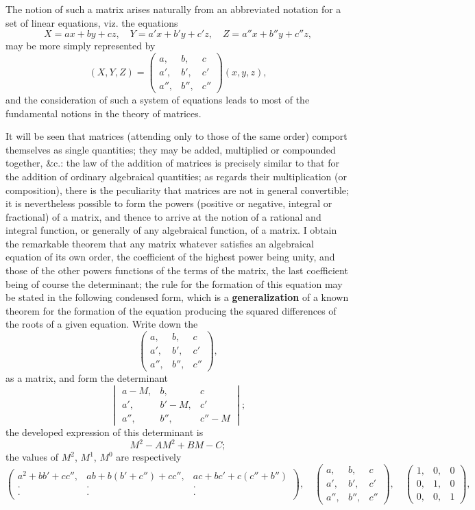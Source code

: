 \documentclass[12pt,a4paper]{article}
\theoremstyle{definition}
\begin{document}
The notion of such a matrix arises naturally from an abbreviated notation for a set of linear equations, viz. the equations
\[
X = ax + by + cz,\quad Y = a'x + b'y + c'z,\quad Z = a''x + b''y + c''z,
\]
may be more simply represented by
\[
(X, Y, Z) = \begin{pmatrix} a, & b, & c \\ a', & b', & c' \\ a'', & b'', & c'' \end{pmatrix}(x, y, z),
\]
and the consideration of such a system of equations leads to most of the fundamental notions in the theory of matrices.

It will be seen that matrices (attending only to those of the same order) comport themselves as single quantities; they may be added, multiplied or compounded together, \&c.: the law of the addition of matrices is precisely similar to that for the addition of ordinary algebraical quantities; as regards their multiplication (or composition), there is the peculiarity that matrices are not in general convertible; it is nevertheless possible to form the powers (positive or negative, integral or fractional) of a matrix, and thence to arrive at the notion of a rational and integral function, or generally of any algebraical function, of a matrix. I obtain the remarkable theorem that any matrix whatever satisfies an algebraical equation of its own order, the coefficient of the highest power being unity, and those of the other powers functions of the terms of the matrix, the last coefficient being of course the determinant; the rule for the formation of this equation may be stated in the following condensed form, which is a {\bfseries generalization} of a known theorem for the formation of the equation producing the squared differences of the roots of a given equation. Write down the 
\[
\begin{pmatrix}
a, & b, & c \\
a', & b', & c' \\
a'', & b'', & c''
\end{pmatrix},
\]
as a matrix, and form the determinant
\[
\begin{vmatrix}
a-M, & b, & c \\
a', & b'-M, & c' \\
a'', & b'', & c''-M
\end{vmatrix};
\]
the developed expression of this determinant is
\[M^2 - AM^2 + BM - C;\]
the values of $M^2$, $M^1$, $M^0$ are respectively
\[
\begin{pmatrix}
a^2+bb'+cc'', & ab+b(b'+c'')+cc'', & ac+bc'+c(c''+b'') \\
\cdot & \cdot & \cdot \\
\cdot & \cdot & \cdot
\end{pmatrix},
\quad
\begin{pmatrix} a, & b, & c \\ a', & b', & c' \\ a'', & b'', & c'' \end{pmatrix},
\quad
\begin{pmatrix} 1, & 0, & 0 \\ 0, & 1, & 0 \\ 0, & 0, & 1 \end{pmatrix},
\]
\end{document}
